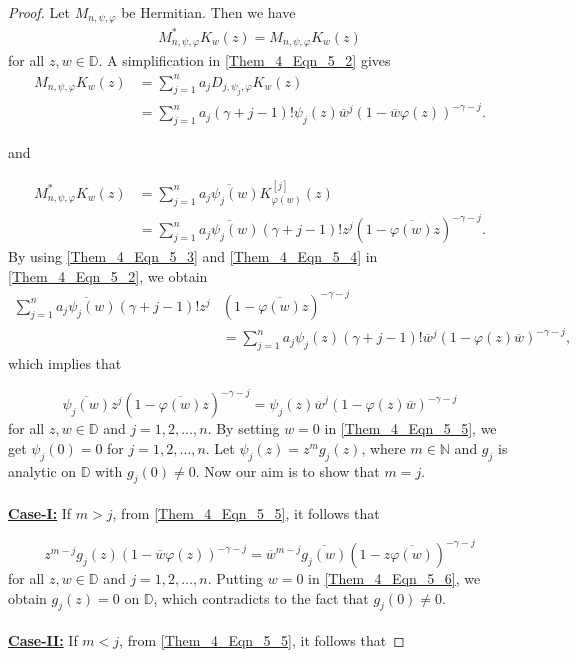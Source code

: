 \documentclass[12pt, reqno]{amsart}
\theoremstyle{definition}
\theoremstyle{remark}
\numberwithin{equation}{section}
\begin{document}
\begin{proof}
		Let $M_{n, \psi, \varphi}$ be Hermitian. 
	Then we have
	\begin{align}\label{Them_4_Eqn_5_2}
	M_{n,\psi, \varphi}^*K_w(z)= M_{n,\psi, \varphi}K_w(z)
	\end{align}
	for all $z,w\in \mathbb{D}$.
	A simplification in \eqref{Them_4_Eqn_5_2} gives
	\begin{align}\label{Them_4_Eqn_5_3}
	M_{n,\psi, \varphi}K_w(z)&=\displaystyle\sum_{j=1}^{n}a_jD_{j,\psi_j, \varphi} K_w(z)\nonumber\\
	&=\displaystyle\sum_{j=1}^{n}a_j(\gamma+j-1)! \psi_j(z)\overline{w}^{j}(1-\overline{w}\varphi(z))^{-\gamma-j}.
	\end{align}

	and 
	
	\begin{align}\label{Them_4_Eqn_5_4}
	 M_{n,\psi, \varphi}^*K_w(z)&=\displaystyle\sum_{j=1}^{n}\overline{a_j\psi_j(w)}K_{\varphi(w)}^{[j]}(z)\nonumber\\
	&=\displaystyle\sum_{j=1}^{n}\overline{a_j\psi_j(w)}(\gamma+j-1)!z^{j}(1-\overline{\varphi(w)}z)^{-\gamma-j}.
	\end{align}
	By using \eqref{Them_4_Eqn_5_3} and \eqref{Them_4_Eqn_5_4} in \eqref{Them_4_Eqn_5_2}, we obtain 
	\begin{align*}
	\displaystyle\sum_{j=1}^{n}\overline{a_j \psi_j(w)}(\gamma+j-1)!z^{j}&(1- \overline{\varphi(w)}z)^{-\gamma-j}\\
	&=\displaystyle\sum_{j=1}^{n}a_j\psi_j(z)(\gamma+j-1)!\overline{w}^{j}(1-\varphi(z)\overline{w})^{-\gamma-j},
	\end{align*}
which implies that 
	
	\begin{equation}\label{Them_4_Eqn_5_5}
	\overline{ \psi_j(w)}z^{j}(1-\overline{\varphi(w)}z)^{-\gamma-j}=\psi_j(z)\overline{w}^{j}(1-\varphi(z)\overline{w})^{-\gamma-j}
	\end{equation}
	for all $z,w\in \mathbb{D}$ and $j=1,2, \dots, n$.	
	By setting $w=0$ in \eqref{Them_4_Eqn_5_5}, we get $\psi_j(0)=0$ for  $j=1,2, \dots, n$. Let $\psi_j(z)=z^mg_j(z)$, where $m\in \mathbb{N}$ and $g_j$ is analytic on $\mathbb{D}$ with $g_j(0)\neq 0$. Now our aim is to show that $m=j$.
	\\ \\
	\underline{\bf Case-I:} If $m>j$, from \eqref{Them_4_Eqn_5_5}, it follows that
	
	\begin{equation}\label{Them_4_Eqn_5_6}
	z^{m-j}g_j(z)(1- \overline{w}\varphi(z))^{-\gamma-j}=\overline{w}^{m-j}\overline{g_j(w)}(1- z\overline{\varphi(w)})^{-\gamma-j}
	\end{equation}
	for all $z,w\in \mathbb{D}$ and $j=1,2, \dots, n$.
	Putting $w=0$ in \eqref{Them_4_Eqn_5_6}, we obtain $g_j(z)=0$ on $\mathbb{D}$, which contradicts to the fact that $g_j(0)\neq 0$. \\ \\	
		\underline{\bf Case-II:} If $m<j$, from \eqref{Them_4_Eqn_5_5}, it follows that
	

\end{proof}
\end{document}
